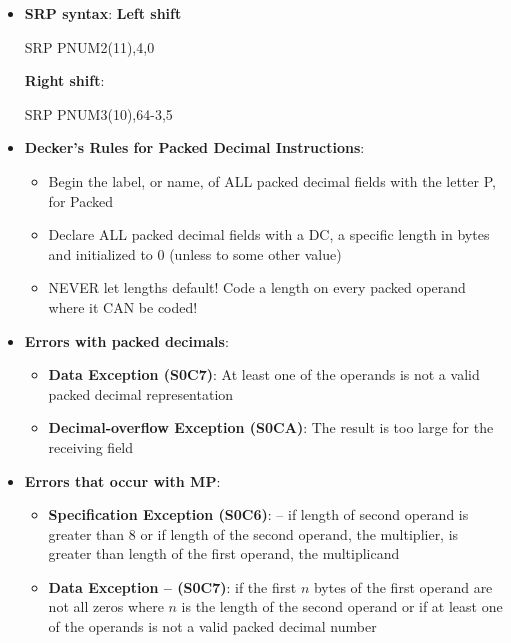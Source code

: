 \documentclass{report}
\begin{document}
\begin{itemize}
        \item \textbf{SRP syntax}:
            \bigbreak \noindent 
            \textbf{Left shift}
            \bigbreak \noindent 
            \begin{cppcode}
                SRP PNUM2(11),4,0 
            \end{cppcode}
            \bigbreak \noindent 
            \textbf{Right shift}:
            \bigbreak \noindent 
            \begin{cppcode}
                SRP PNUM3(10),64-3,5
            \end{cppcode}
        \item \textbf{Decker's Rules for Packed Decimal Instructions}:
            \begin{itemize}
                \item Begin the label, or name, of ALL packed decimal fields with the letter P, for Packed
                \item Declare ALL packed decimal fields with a DC, a specific length in bytes and initialized to 0 (unless to some other value)
                \item NEVER let lengths default! Code a length on every packed operand where it CAN be coded!
            \end{itemize}
        \item \textbf{Errors with packed decimals}:
            \begin{itemize}
                \item \textbf{Data Exception (S0C7)}: At least one of the operands is not a valid packed decimal representation
                \item \textbf{Decimal-overflow Exception (S0CA)}: The result is too large for the receiving field
            \end{itemize}
        \item \textbf{Errors that occur with MP}:
            \begin{itemize}
                \item \textbf{Specification Exception (S0C6)}: – if length of second operand is greater than 8 or if length of the second operand, the multiplier, is greater than length of the first operand, the multiplicand
                \item \textbf{Data Exception – (S0C7)}: if the first $n$ bytes of the first operand are not all zeros where $n$ is the length of the second operand or if at least one of the operands is not a valid packed decimal number
            \end{itemize}

\end{itemize}
\end{document}
